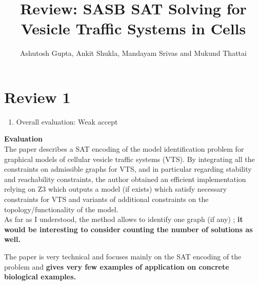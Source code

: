 \documentclass{llncs}
\begin{document}
\title{Review: SASB SAT Solving for Vesicle Traffic Systems in Cells} 

\author{Ashutosh Gupta, Ankit Shukla, Mandayam Srivas and Mukund Thattai}

\maketitle         

\section{Review 1}
\begin{enumerate}
\item {Overall evaluation: Weak accept\\}
\end{enumerate}
\textbf{{\color{black} Evaluation\\}}
The paper describes a SAT encoding of the model identification problem for graphical
models of cellular vesicle traffic systems (VTS).
By integrating all the constraints on admissible graphs for VTS, and in particular
regarding stability and reachability constraints, the author obtained an efficient
implementation relying on Z3 which outputs a model (if exists) which satisfy
necessary constraints for VTS and variants of additional constraints on the
topology/functionality of the model.\\



As far as I understood, the method allows to identify one graph (if any) ; \textbf{it would be interesting to consider counting the number of solutions as well.}\newline
{\color{red}{Ashutosh}}

The paper is very technical and focuses mainly on the SAT encoding of the problem
and \textbf{gives very few examples of application on concrete biological examples.}\\ 
{\color{red}{Ankit\\}}
\end{document}
